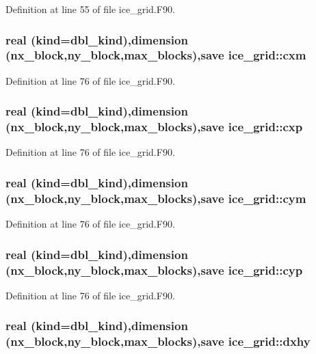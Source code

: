 Definition at line 55 of file ice\_\-grid.F90.\hypertarget{namespaceice__grid_a83a8de6d0e58a6771b3d915acd63afd7}{
\subsubsection[{cxm}]{\setlength{\rightskip}{0pt plus 5cm}real (kind=dbl\_\-kind),dimension (nx\_\-block,ny\_\-block,max\_\-blocks),save {\bf ice\_\-grid::cxm}}}
\label{namespaceice__grid_a83a8de6d0e58a6771b3d915acd63afd7}


Definition at line 76 of file ice\_\-grid.F90.\hypertarget{namespaceice__grid_a3c40a8ee2794b13b04b0598c90bf420f}{
\subsubsection[{cxp}]{\setlength{\rightskip}{0pt plus 5cm}real (kind=dbl\_\-kind),dimension (nx\_\-block,ny\_\-block,max\_\-blocks),save {\bf ice\_\-grid::cxp}}}
\label{namespaceice__grid_a3c40a8ee2794b13b04b0598c90bf420f}


Definition at line 76 of file ice\_\-grid.F90.\hypertarget{namespaceice__grid_adb5e2792c5861e949ad784e35f485c08}{
\subsubsection[{cym}]{\setlength{\rightskip}{0pt plus 5cm}real (kind=dbl\_\-kind),dimension (nx\_\-block,ny\_\-block,max\_\-blocks),save {\bf ice\_\-grid::cym}}}
\label{namespaceice__grid_adb5e2792c5861e949ad784e35f485c08}


Definition at line 76 of file ice\_\-grid.F90.\hypertarget{namespaceice__grid_a30e2151554a97e140124f4cb4317a054}{
\subsubsection[{cyp}]{\setlength{\rightskip}{0pt plus 5cm}real (kind=dbl\_\-kind),dimension (nx\_\-block,ny\_\-block,max\_\-blocks),save {\bf ice\_\-grid::cyp}}}
\label{namespaceice__grid_a30e2151554a97e140124f4cb4317a054}


Definition at line 76 of file ice\_\-grid.F90.\hypertarget{namespaceice__grid_a0247c390ce33b9435bbff4edbff8b9e7}{
\subsubsection[{dxhy}]{\setlength{\rightskip}{0pt plus 5cm}real (kind=dbl\_\-kind),dimension (nx\_\-block,ny\_\-block,max\_\-blocks),save {\bf ice\_\-grid::dxhy}}}
\label{namespaceice__grid_a0247c390ce33b9435bbff4edbff8b9e7}


